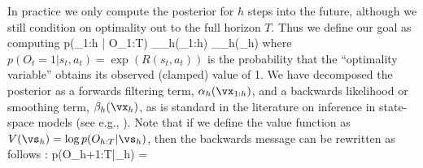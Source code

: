 In practice we  only compute the posterior
for $h$ steps into the future,
although we still condition on optimality
out to the full horizon $T$.
Thus we define our goal as computing
\be
p(\vx_{1:h} | O_{1:T})
\propto
{}_{\alpha_h(\vx_{1:h})}
_{\beta_h(\vx_h)}
\label{eqn:target}
\ee
where $p(O_t=1|s_t,a_t) = \exp(R(s_t,a_t))$
is the probability that the ``optimality variable''
obtains its observed (clamped) value of 1.
We have decomposed the posterior as a forwards filtering term,
$\alpha_h(\vx_{1:h})$,
and a backwards likelihood or smoothing term,
$\beta_h(\vx_h)$,
as is standard in the literature
on inference in state-space models
(see e.g., \citep[Ch.8-9]{book2}).
Note that if we define the value function as
$V(\vs_h) = \log p(O_{h:T}|\vs_h)$,
then 
the backwards message can be rewritten as
follows  \citep{Piche2019}:
\be
p(O_{h+1:T}|\vx_h) = 
\ee

